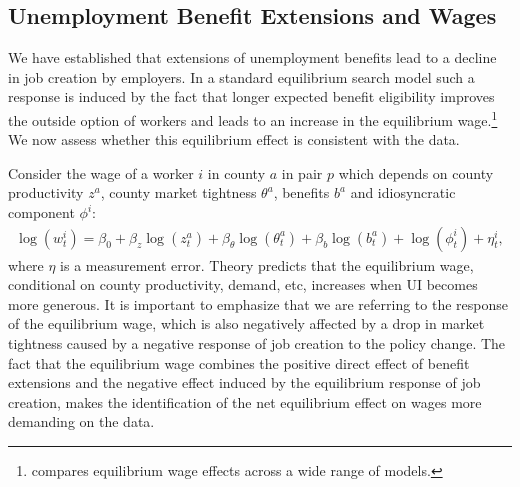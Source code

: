 \documentclass[12pt]{article}
\newcommand{\1}{\mathbf{1}}
\newcommand{\beq}{\begin{eqnarray}}
\newcommand{\eeq}{\end{eqnarray}}
\begin{document}
\subsection{Unemployment Benefit Extensions and Wages}
\label{sec:wages}

We have established that extensions of unemployment benefits lead to a decline in job creation by employers. In a standard equilibrium search model such a response is induced by the fact that longer expected benefit eligibility improves the outside option of workers and leads to an increase in the equilibrium wage.\footnote{\citet{pissarides:98} compares equilibrium wage effects across a wide range of models.} We now assess whether this equilibrium effect is consistent with the data.

Consider the wage of a worker $i$ in county $a$ in pair $p$ which depends on county productivity $z^a$, county market tightness $\theta^a$, benefits $b^a$ and idiosyncratic component $\phi^i$:
\beq \label{eq:wage_raw}
\log (w_t^i) = \beta_0 + \beta_z \log(z_t^a) + \beta_{\theta} \log(\theta_t^a) + \beta_b \log(b_t^a) + \log(\phi_t^i) + \eta_t^i,
\eeq
where $\eta$ is a measurement error.
Theory predicts that the equilibrium wage, conditional on county productivity, demand, etc, increases when UI becomes more generous. It is important to emphasize that we are referring to the response of the equilibrium wage, which is also negatively affected  by a drop in market tightness caused by a negative response of job creation to the policy change. The fact that the equilibrium wage combines the positive direct effect of benefit extensions and the negative effect induced by the equilibrium response of job creation, makes the identification of the net equilibrium effect on wages more demanding on the data.
\end{document}
